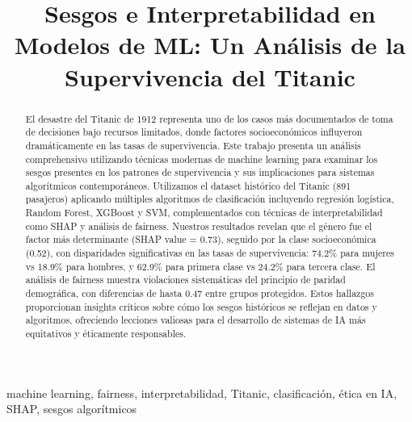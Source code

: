 \documentclass[conference]{IEEEtran}
\begin{document}
\title{Sesgos e Interpretabilidad en Modelos de ML: Un Análisis de la Supervivencia del Titanic}

\author{
}

\maketitle

\begin{abstract}
El desastre del Titanic de 1912 representa uno de los casos más documentados de toma de decisiones bajo recursos limitados, donde factores socioeconómicos influyeron dramáticamente en las tasas de supervivencia. Este trabajo presenta un análisis comprehensivo utilizando técnicas modernas de machine learning para examinar los sesgos presentes en los patrones de supervivencia y sus implicaciones para sistemas algorítmicos contemporáneos. Utilizamos el dataset histórico del Titanic (891 pasajeros) aplicando múltiples algoritmos de clasificación incluyendo regresión logística, Random Forest, XGBoost y SVM, complementados con técnicas de interpretabilidad como SHAP y análisis de fairness. Nuestros resultados revelan que el género fue el factor más determinante (SHAP value = 0.73), seguido por la clase socioeconómica (0.52), con disparidades significativas en las tasas de supervivencia: 74.2\% para mujeres vs 18.9\% para hombres, y 62.9\% para primera clase vs 24.2\% para tercera clase. El análisis de fairness muestra violaciones sistemáticas del principio de paridad demográfica, con diferencias de hasta 0.47 entre grupos protegidos. Estos hallazgos proporcionan insights críticos sobre cómo los sesgos históricos se reflejan en datos y algoritmos, ofreciendo lecciones valiosas para el desarrollo de sistemas de IA más equitativos y éticamente responsables.
\end{abstract}

\begin{IEEEkeywords}
machine learning, fairness, interpretabilidad, Titanic, clasificación, ética en IA, SHAP, sesgos algorítmicos
\end{IEEEkeywords}
\end{document}
